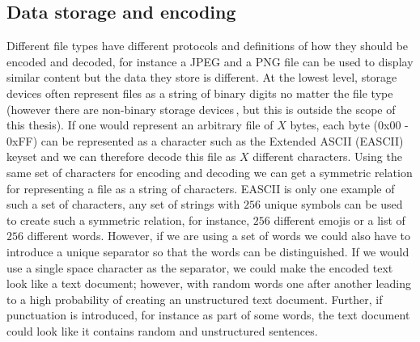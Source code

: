 \subsection{Data storage and encoding}
Different file types have different protocols and definitions of how they should be encoded and decoded, for instance a JPEG and a PNG file can be used to display similar content but the data they store is different. At the lowest level, storage devices often represent files as a string of binary digits no matter the file type (however there are non-binary storage devices\,\cite{MultistateDataStorage2020}, but this is outside the scope of this thesis). If one would represent an arbitrary file of $X$ bytes, each byte (0x00 - 0xFF) can be represented as a character such as the Extended ASCII (EASCII) keyset and we can therefore decode this file as $X$ different characters. Using the same set of characters for encoding and decoding we can get a symmetric relation for representing a file as a string of characters. EASCII is only one example of such a set of characters, any set of strings with $256$ unique symbols can be used to create such a symmetric relation, for instance, $256$ different emojis or a list of $256$ different words. However, if we are using a set of words we could also have to introduce a unique separator so that the words can be distinguished. If we would use a single space character as the separator, we could make the encoded text look like a text document; however, with random words one after another leading to a high probability of creating an unstructured text document. Further, if punctuation is introduced, for instance as part of some words, the text document could look like it contains random and unstructured sentences.


